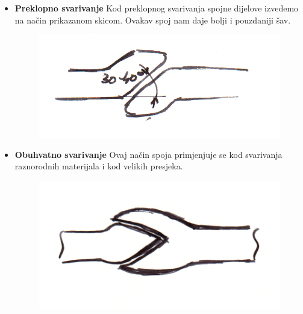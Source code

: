 \documentclass[a4paper,12pt]{article}
\numberwithin{figure}{section}
\begin{document}
\begin{itemize}
\begin{figure}[!h]
\end{figure}
\FloatBarrier\item \textbf{Preklopno svarivanje} Kod preklopnog svarivanja spojne dijelove izvedemo na način prikazanom skicom. Ovakav spoj nam daje bolji i pouzdaniji šav.
\begin{figure}[!h]
\centering
\includegraphics[scale=0.15]{image_43-2.png}
\end{figure}
\FloatBarrier\item \textbf{Obuhvatno svarivanje} Ovaj način spoja primjenjuje se kod svarivanja raznorodnih materijala i kod velikih presjeka.
\begin{figure}[!h]
\centering
\includegraphics[scale=0.15]{image_43-3.png}
\end{figure}
\FloatBarrier\end{itemize}
\end{document}
